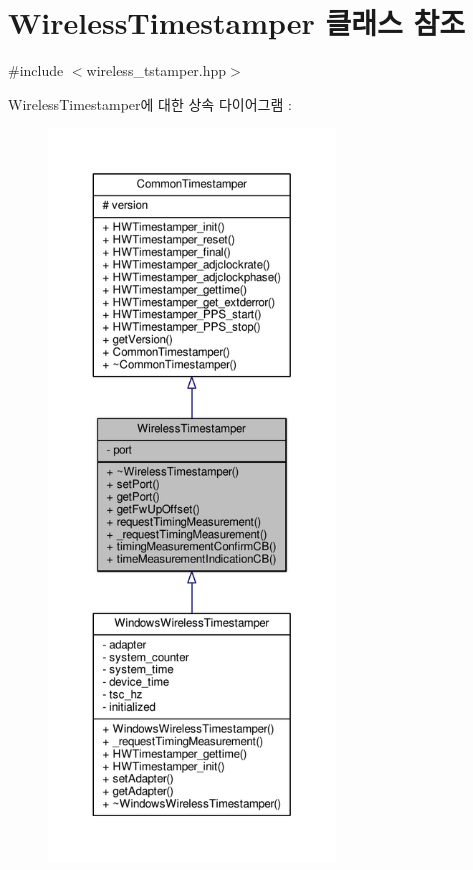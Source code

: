 \hypertarget{class_wireless_timestamper}{}\section{Wireless\+Timestamper 클래스 참조}
\label{class_wireless_timestamper}


{\ttfamily \#include $<$wireless\+\_\+tstamper.\+hpp$>$}



Wireless\+Timestamper에 대한 상속 다이어그램 \+: 
\nopagebreak
\begin{figure}[H]
\begin{center}
\leavevmode
\includegraphics[height=550pt]{class_wireless_timestamper__inherit__graph}
\end{center}
\end{figure}


